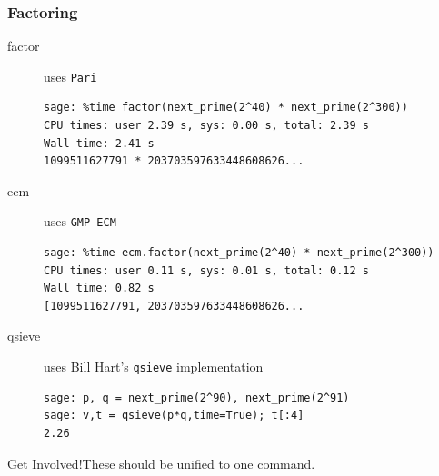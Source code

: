 \documentclass[10pt]{beamer}
\newcommand{\getinvolved}[1]{\begin{block}{Get Involved!}#1\end{block}}
\begin{document}
\begin{frame}[fragile]
\frametitle{Factoring}
\begin{description}
 \item[factor] uses {\tt Pari}
\begin{lstlisting}
sage: %time factor(next_prime(2^40) * next_prime(2^300))
CPU times: user 2.39 s, sys: 0.00 s, total: 2.39 s
Wall time: 2.41 s
1099511627791 * 203703597633448608626...
\end{lstlisting}

\item[ecm] uses {\tt GMP-ECM}

\begin{lstlisting}
sage: %time ecm.factor(next_prime(2^40) * next_prime(2^300))
CPU times: user 0.11 s, sys: 0.01 s, total: 0.12 s
Wall time: 0.82 s
[1099511627791, 203703597633448608626...
\end{lstlisting}

\item[qsieve] uses Bill Hart's {\tt qsieve} implementation
\begin{lstlisting}
sage: p, q = next_prime(2^90), next_prime(2^91)
sage: v,t = qsieve(p*q,time=True); t[:4]
2.26
\end{lstlisting}
\end{description}

\vspace{-1.2em}
\getinvolved{These should be unified to one command.}

\end{frame}
\end{document}
